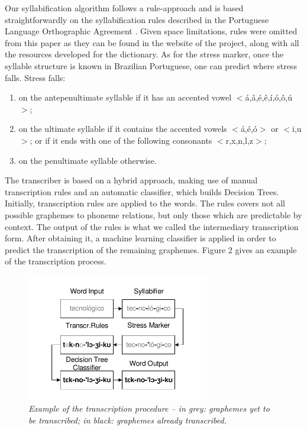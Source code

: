 Our syllabification algorithm follows a rule-approach and is based straightforwardly on the syllabification rules described in the Portuguese Language Orthographic Agreement \cite{Acordo2009}. Given space limitations, rules were omitted from this paper as they can be found in the website of the project, along with all the resources developed for the dictionary. As for the stress marker, once the syllable structure is known in Brazilian Portuguese, one can predict where stress falls. Stress falls:

\begin{enumerate}
 \item on the antepenultimate syllable if it has an accented vowel $<$\'a,\^a,\'e,\^e,\'i,\'o,\^o,\'u$>$;
 \item on the ultimate syllable if it contains the accented vowels $<$\'a,\'e,\'o$>$ or $<$i,u$>$; or if it ends with one of the following consonants $<$r,x,n,l,z$>$;
 \item on the penultimate syllable otherwise.
\end{enumerate}

The transcriber is based on a hybrid approach, making use of manual transcription rules and an automatic classifier, which builds Decision Trees. Initially, transcription rules are applied to the words. The rules covers not all possible graphemes to phoneme relations, but only those which are predictable by context. The output of the rules is what we called the intermediary transcription form. After obtaining it, a machine learning classifier is applied in order to predict the transcription of the remaining graphemes. Figure 2 gives an example of the transcription process.

\begin{figure}[!ht]
\centerline{ \includegraphics[width=8cm]{./gfx/transcript_ex.pdf}}
\caption{{\it Example of the transcription procedure -- in grey: graphemes yet to be transcribed; in black: graphemes already transcribed.}}
\label{transcExample}
\end{figure}

